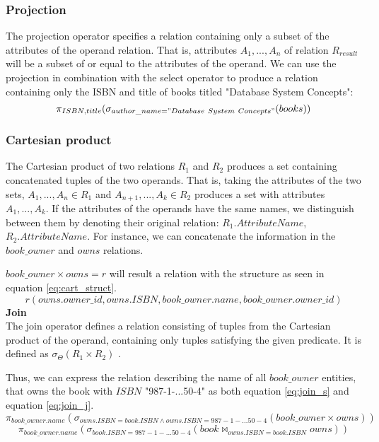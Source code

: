 \subsubsection*{Projection}
The projection operator specifies a relation containing only a subset of the attributes of the operand relation\cite{DBSBook}.
That is, attributes $A_1, ..., A_n$ of relation $R_{result}$ will be a subset of or equal to the attributes of the operand.
We can use the projection in combination with the select operator to produce a relation containing only the ISBN and title of books titled "Database System Concepts":
$$\pi_{ISBN,title} (\sigma_{author\_name = "Database\ System\ Concepts"}(books))$$
\subsubsection*{Cartesian product}
The Cartesian product of two relations $R_1$ and $R_2$ produces a set containing concatenated tuples of the two operands.
That is, taking the attributes of the two sets, $A_1,...,A_n \in R_1$ and $A_{n+1},...,A_k \in R_2$ produces a set with attributes $A_1,...,A_k$.
If the attributes of the operands have the same names, we distinguish between them by denoting their original relation: $R_1.AttributeName$, $R_2.AttributeName$. \cite{DBSBook}
For instance, we can concatenate the information in the $book\_owner$ and $owns$ relations.

$book\_owner \times owns = r$ will result a relation with the structure as seen in equation \ref{eq:cart_struct}.
\begin{equation}\label{eq:cart_struct}
    r(owns.owner\_id, owns.ISBN,book\_owner.name,book\_owner.owner\_id)
\end{equation}
\textbf{Join}\\
The join operator defines a relation consisting of tuples from the Cartesian product of the operand, containing only tuples satisfying the given predicate.
It is defined as $\sigma_{\Theta} (R_1 \times R_2)$ \cite{DBSBook}.

Thus, we can express the relation describing the name of all $book\_owner$ entities, that owns the book with $ISBN$ "987-1-...50-4" as both equation \ref{eq:join_s} and equation \ref{eq:join_j}.
\begin{equation}\label{eq:join_s}
    \pi_{book\_owner.name} (\sigma_{owns.ISBN = book.ISBN \wedge owns.ISBN = 987-1-...50-4}  (book\_owner \times owns))
\end{equation}
\begin{equation}\label{eq:join_j}
    \pi_{book\_owner.name} (\sigma_{book.ISBN = 987-1-...50-4} (book \Join_{owns.ISBN = book.ISBN} owns))
\end{equation}\\


